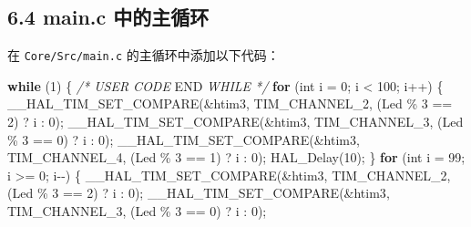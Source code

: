 \documentclass[
  chinese,
  UTF8,
  oneside,
  openany]{ctexbook}
\newenvironment{Shaded}{}{}
\newcommand{\CommentTok}[1]{\textcolor[rgb]{0.38,0.63,0.69}{\textit{#1}}}
\newcommand{\ControlFlowTok}[1]{\textcolor[rgb]{0.00,0.44,0.13}{\textbf{#1}}}
\newcommand{\DataTypeTok}[1]{\textcolor[rgb]{0.56,0.13,0.00}{#1}}
\newcommand{\DecValTok}[1]{\textcolor[rgb]{0.25,0.63,0.44}{#1}}
\newcommand{\NormalTok}[1]{#1}
\newcommand{\OperatorTok}[1]{\textcolor[rgb]{0.40,0.40,0.40}{#1}}
\newcommand{\RegionMarkerTok}[1]{#1}
\begin{document}
\subsection{6.4 main.c
中的主循环}\label{main.c-ux4e2dux7684ux4e3bux5faaux73af}

在 \texttt{Core/Src/main.c} 的主循环中添加以下代码：

\begin{Shaded}
\begin{Highlighting}[]
\ControlFlowTok{while} \OperatorTok{(}\DecValTok{1}\OperatorTok{)}
\OperatorTok{\{}
    \CommentTok{/* USER CODE }\RegionMarkerTok{END}\CommentTok{ WHILE */}
    \ControlFlowTok{for} \OperatorTok{(}\DataTypeTok{int}\NormalTok{ i }\OperatorTok{=} \DecValTok{0}\OperatorTok{;}\NormalTok{ i }\OperatorTok{\textless{}} \DecValTok{100}\OperatorTok{;}\NormalTok{ i}\OperatorTok{++)}
    \OperatorTok{\{}
\NormalTok{        \_\_HAL\_TIM\_SET\_COMPARE}\OperatorTok{(\&}\NormalTok{htim3}\OperatorTok{,}\NormalTok{ TIM\_CHANNEL\_2}\OperatorTok{,} \OperatorTok{(}\NormalTok{Led }\OperatorTok{\%} \DecValTok{3} \OperatorTok{==} \DecValTok{2}\OperatorTok{)} \OperatorTok{?}\NormalTok{ i }\OperatorTok{:} \DecValTok{0}\OperatorTok{);}
\NormalTok{        \_\_HAL\_TIM\_SET\_COMPARE}\OperatorTok{(\&}\NormalTok{htim3}\OperatorTok{,}\NormalTok{ TIM\_CHANNEL\_3}\OperatorTok{,} \OperatorTok{(}\NormalTok{Led }\OperatorTok{\%} \DecValTok{3} \OperatorTok{==} \DecValTok{0}\OperatorTok{)} \OperatorTok{?}\NormalTok{ i }\OperatorTok{:} \DecValTok{0}\OperatorTok{);}
\NormalTok{        \_\_HAL\_TIM\_SET\_COMPARE}\OperatorTok{(\&}\NormalTok{htim3}\OperatorTok{,}\NormalTok{ TIM\_CHANNEL\_4}\OperatorTok{,} \OperatorTok{(}\NormalTok{Led }\OperatorTok{\%} \DecValTok{3} \OperatorTok{==} \DecValTok{1}\OperatorTok{)} \OperatorTok{?}\NormalTok{ i }\OperatorTok{:} \DecValTok{0}\OperatorTok{);}
\NormalTok{        HAL\_Delay}\OperatorTok{(}\DecValTok{10}\OperatorTok{);}
    \OperatorTok{\}}
    \ControlFlowTok{for} \OperatorTok{(}\DataTypeTok{int}\NormalTok{ i }\OperatorTok{=} \DecValTok{99}\OperatorTok{;}\NormalTok{ i }\OperatorTok{\textgreater{}=} \DecValTok{0}\OperatorTok{;}\NormalTok{ i}\OperatorTok{{-}{-})}
    \OperatorTok{\{}
\NormalTok{        \_\_HAL\_TIM\_SET\_COMPARE}\OperatorTok{(\&}\NormalTok{htim3}\OperatorTok{,}\NormalTok{ TIM\_CHANNEL\_2}\OperatorTok{,} \OperatorTok{(}\NormalTok{Led }\OperatorTok{\%} \DecValTok{3} \OperatorTok{==} \DecValTok{2}\OperatorTok{)} \OperatorTok{?}\NormalTok{ i }\OperatorTok{:} \DecValTok{0}\OperatorTok{);}
\NormalTok{        \_\_HAL\_TIM\_SET\_COMPARE}\OperatorTok{(\&}\NormalTok{htim3}\OperatorTok{,}\NormalTok{ TIM\_CHANNEL\_3}\OperatorTok{,} \OperatorTok{(}\NormalTok{Led }\OperatorTok{\%} \DecValTok{3} \OperatorTok{==} \DecValTok{0}\OperatorTok{)} \OperatorTok{?}\NormalTok{ i }\OperatorTok{:} \DecValTok{0}\OperatorTok{);}

\end{Highlighting}
\end{Shaded}
\end{document}
